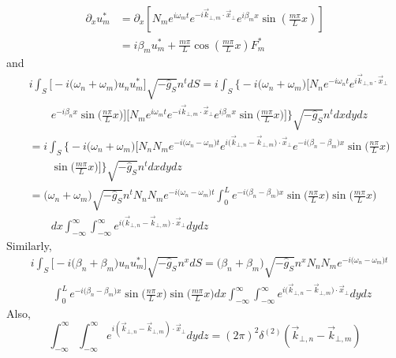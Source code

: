 \documentclass[english]{article}
\begin{document}
 {}
\begin{align*}
\partial_{x}u^{*}_{m} & =\partial_{x}\left[N_{m}e^{i\omega_{m}t}e^{-i\vec{k}_{\bot,m}\cdot\vec{x}_{\bot}}e^{i\beta_{m}x}\sin\left(\frac{m\pi}{L}x\right)\right]\\
 & =i\beta_{m}u^{*}_{m}+\frac{m\pi}{L}\cos\left(\frac{m\pi}{L}x\right)F^{*}_{m}
\end{align*}
 and 
\begin{align*}
 & i\int_{S}\biggl[-i\biggl(\omega_{n}+\omega_{m}\biggr)u_{n}u^{*}_{m}\biggr]\sqrt{-\hat{g}_{S}}n^{t}dS=i\int_{S}\biggl\{-i\biggl(\omega_{n}+\omega_{m}\biggr)\biggl[N_{n}e^{-i\omega_{n}t}e^{i\vec{k}_{\bot,n}\cdot\vec{x}_{\bot}}\\
 & \qquad e^{-i\beta_{n}x}\sin\biggl(\frac{n\pi}{L}x\biggr)\biggr]\biggl[N_{m}e^{i\omega_{m}t}e^{-i\vec{k}_{\bot,m}\cdot\vec{x}_{\bot}}e^{i\beta_{m}x}\sin\biggl(\frac{m\pi}{L}x\biggr)\biggr]\biggr\}\sqrt{-\hat{g}_{S}}n^{t}dxdydz\\
 & =i\int_{S}\biggl\{-i\biggl(\omega_{n}+\omega_{m}\biggr)\biggl[N_{n}N_{m}e^{-i\biggl(\omega_{n}-\omega_{m}\biggr)t}e^{i\biggl(\vec{k}_{\bot,n}-\vec{k}_{\bot,m}\biggr)\cdot\vec{x}_{\bot}}e^{-i\biggl(\beta_{n}-\beta_{m}\biggr)x}\sin\biggl(\frac{n\pi}{L}x\biggr)\\
 & \qquad\sin\biggl(\frac{m\pi}{L}x\biggr)\biggr]\biggr\}\sqrt{-\hat{g}_{S}}n^{t}dxdydz\\
 & =\biggl(\omega_{n}+\omega_{m}\biggr)\sqrt{-\hat{g}_{S}}n^{t}N_{n}N_{m}e^{-i\biggl(\omega_{n}-\omega_{m}\biggr)t}\int^{L}_{0}e^{-i\biggl(\beta_{n}-\beta_{m}\biggr)x}\sin\biggl(\frac{n\pi}{L}x\biggr)\sin\biggl(\frac{m\pi}{L}x\biggr)\\
 & \qquad dx\int^{\infty}_{-\infty}\int^{\infty}_{-\infty}e^{i\biggl(\vec{k}_{\bot,n}-\vec{k}_{\bot,m}\biggr)\cdot\vec{x}_{\bot}}dydz
\end{align*}
 Similarly, 
\begin{align*}
 & i\int_{S}\biggl[-i\biggl(\beta_{n}+\beta_{m}\biggr)u_{n}u^{*}_{m}\biggr]\sqrt{-\hat{g}_{S}}n^{x}dS=\biggl(\beta_{n}+\beta_{m}\biggr)\sqrt{-\hat{g}_{S}}n^{x}N_{n}N_{m}e^{-i\biggl(\omega_{n}-\omega_{m}\biggr)t}\\
 & \qquad\int^{L}_{0}e^{-i\biggl(\beta_{n}-\beta_{m}\biggr)x}\sin\biggl(\frac{n\pi}{L}x\biggr)\sin\biggl(\frac{m\pi}{L}x\biggr)dx\int^{\infty}_{-\infty}\int^{\infty}_{-\infty}e^{i\biggl(\vec{k}_{\bot,n}-\vec{k}_{\bot,m}\biggr)\cdot\vec{x}_{\bot}}dydz
\end{align*}
 Also, 
\[
\int^{\infty}_{-\infty}\int^{\infty}_{-\infty}e^{i\left(\vec{k}_{\bot,n}-\vec{k}_{\bot,m}\right)\cdot\vec{x}_{\bot}}dydz=\left(2\pi\right)^{2}\delta^{(2)}\left(\vec{k}_{\bot,n}-\vec{k}_{\bot,m}\right)
\]
\end{document}

